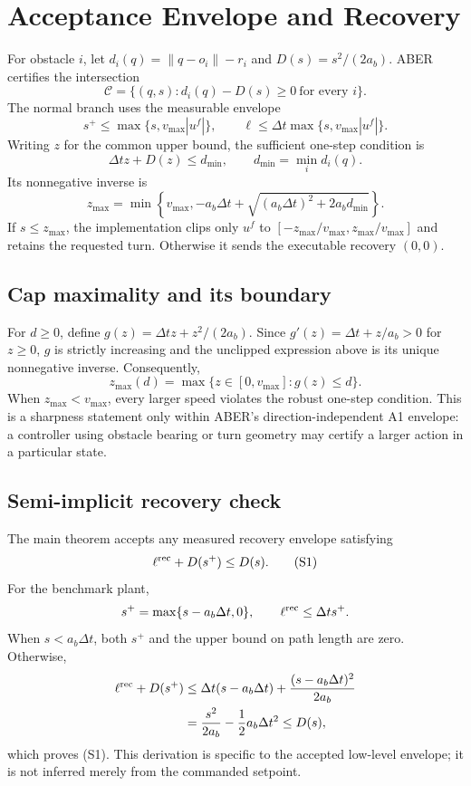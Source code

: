 \documentclass[letterpaper]{article}
\begin{document}
\section{Acceptance Envelope and Recovery}

For obstacle $i$, let
$d_i(q)=\|q-o_i\|-r_i$ and
$D(s)=s^2/(2a_b)$.  ABER certifies the intersection
\[
 \mathcal C=\{(q,s):d_i(q)-D(s)\ge0\ \text{for every }i\}.
\]
The normal branch uses the measurable envelope
\[
 s^+\le\max\{s,v_{\max}|u^f|\},\qquad
 \ell\le\Delta t\max\{s,v_{\max}|u^f|\}.
\]
Writing $z$ for the common upper bound, the sufficient one-step condition is
\[
 \Delta t z+D(z)\le d_{\min},\qquad
 d_{\min}=\min_i d_i(q).
\]
Its nonnegative inverse is
\[
 z_{\max}=\min\!\left\{v_{\max},
 -a_b\Delta t+
 \sqrt{(a_b\Delta t)^2+2a_bd_{\min}}\right\}.
\]
If $s\le z_{\max}$, the implementation clips only $u^f$ to
$[-z_{\max}/v_{\max},z_{\max}/v_{\max}]$ and retains the requested turn.
Otherwise it sends the executable recovery $(0,0)$.

\subsection{Cap maximality and its boundary}

For $d\ge0$, define
$g(z)=\Delta t z+z^2/(2a_b)$.  Since
$g'(z)=\Delta t+z/a_b>0$ for $z\ge0$, $g$ is strictly increasing and the
unclipped expression above is its unique nonnegative inverse.  Consequently,
\[
 z_{\max}(d)=\max\{z\in[0,v_{\max}]:g(z)\le d\}.
\]
When $z_{\max}<v_{\max}$, every larger speed violates the robust one-step
condition.  This is a sharpness statement only within ABER's
direction-independent A1 envelope: a controller using obstacle bearing or
turn geometry may certify a larger action in a particular state.

\subsection{Semi-implicit recovery check}

The main theorem accepts any measured recovery envelope satisfying
\[
 \ell^{\rm rec}+D(s^+)\le D(s).                 \tag{S1}
\]
For the benchmark plant,
\[
 s^+=\max\{s-a_b\Delta t,0\},\qquad
 \ell^{\rm rec}\le\Delta t s^+.
\]
When $s<a_b\Delta t$, both $s^+$ and the upper bound on path length are zero.
Otherwise,
\begin{align*}
 \ell^{\rm rec}+D(s^+)
 &\le \Delta t(s-a_b\Delta t)
   +\frac{(s-a_b\Delta t)^2}{2a_b}\\
 &=\frac{s^2}{2a_b}-\frac12a_b\Delta t^2
 \le D(s),
\end{align*}
which proves (S1).  This derivation is specific to the accepted low-level
envelope; it is not inferred merely from the commanded setpoint.
\end{document}
